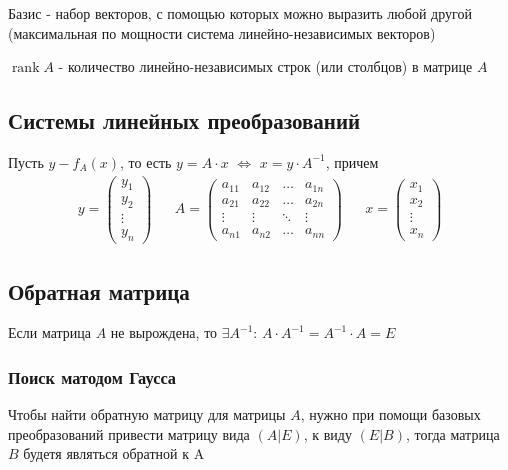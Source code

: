 \documentclass[class=article,a4paper,12pt,crop=false]{standalone}
\DeclareMathOperator{\rank}{rank}
\begin{document}
Базис - набор векторов, с помощью которых можно выразить любой другой (максимальная по 
мощности система линейно-независимых векторов)

$\rank{A}$ - количество линейно-независимых строк (или столбцов) в матрице $A$

\subsection{Системы линейных преобразований}

Пусть $y - f_A(x)$, то есть $y = A\cdot x$ $\Leftrightarrow$ $x = y\cdot A^{-1}$, причем
\begin{equation}
    \begin{aligned}
        y = \begin{pmatrix}
            y_1 \\ y_2 \\ \vdots \\ y_n
        \end{pmatrix} & &
        A = \begin{pmatrix}
            a_{11} & a_{12} & \dots & a_{1n} \\
            a_{21} & a_{22} & \dots & a_{2n} \\
            \vdots & \vdots & \ddots & \vdots \\
            a_{n1} & a_{n2} & \dots & a_{nn}
        \end{pmatrix} & &
        x = \begin{pmatrix}
            x_1 \\ x_2 \\ \vdots \\ x_n
        \end{pmatrix}
    \end{aligned}
\end{equation}

\subsection{Обратная матрица}

Если матрица $A$ не вырождена, то $\exists A^{-1}$: $A\cdot A^{-1} = A^{-1}\cdot A = E$

\subsubsection{Поиск матодом Гаусса}

Чтобы найти обратную матрицу для матрицы $A$, нужно при помощи базовых преобразований
привести матрицу вида $\left(A | E\right)$, к виду $\left(E | B\right)$, тогда матрица
$B$ будетя являться обратной к A
\end{document}

